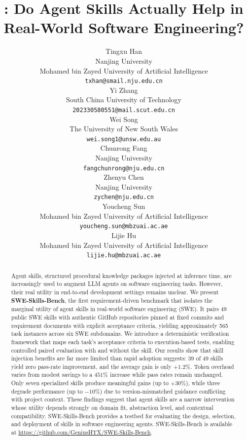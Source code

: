 \documentclass{article}
\title{\ours{}: Do Agent Skills Actually Help in Real-World Software Engineering?}
\author{
  Tingxu Han \footnotemark[1]\\
  Nanjing University \\
  Mohamed bin Zayed University of Artificial Intelligence \\
  \texttt{txhan@smail.nju.edu.cn} \\[-0.3em]
  \And
  Yi Zhang \\
  South China University of Technology \\
  \texttt{202330580551@mail.scut.edu.cn} \\[-0.3em]
  \And
  Wei Song \\
  The University of New South Wales \\
  \texttt{wei.song1@unsw.edu.au} \\[-0.3em]
  \And
  Chunrong Fang \footnotemark[3]\\
  Nanjing University \\
  \texttt{fangchunrong@nju.edu.cn} \\[-0.3em]
  \And
  Zhenyu Chen \\
  Nanjing University \\
  \texttt{zychen@nju.edu.cn} \\[-0.3em]
  \And
  Youcheng Sun \\
  Mohamed bin Zayed University of Artificial Intelligence \\
  \texttt{youcheng.sun@mbzuai.ac.ae} \\[-0.3em]
  \And
  Lijie Hu \footnotemark[3]\\
  Mohamed bin Zayed University of Artificial Intelligence \\
  \texttt{lijie.hu@mbzuai.ac.ae} \\
}
\newcommand{\ours}{SWE-Skills-Bench}
\begin{document}
\maketitle
\renewcommand{\thefootnote}{\fnsymbol{footnote}}
\vspace{-2em}
\begin{abstract}
Agent skills, structured procedural knowledge packages injected at inference time, are increasingly used to augment LLM agents on software engineering tasks.
However, their real utility in end-to-end development settings remains unclear.
We present \textbf{\ours{}}, the first requirement-driven benchmark that isolates the marginal utility of agent skills in real-world software engineering (SWE).
It pairs 49 public SWE skills with authentic GitHub repositories pinned at fixed commits and requirement documents with explicit acceptance criteria, yielding approximately 565 task instances across six SWE subdomains.
We introduce a deterministic verification framework that maps each task's acceptance criteria to execution-based tests, enabling controlled paired evaluation with and without the skill.
Our results show that skill injection benefits are far more limited than rapid adoption suggests: 39 of 49 skills yield zero pass-rate improvement, and the average gain is only $+1.2\%$. Token overhead varies from modest savings to a $451\%$ increase while pass rates remain unchanged. Only seven specialized skills produce meaningful gains (up to $+30\%$), while three degrade performance (up to $-10\%$) due to version-mismatched guidance conflicting with project context.
These findings suggest that agent skills are a narrow intervention whose utility depends strongly on domain fit, abstraction level, and contextual compatibility.
SWE-Skills-Bench provides a testbed for evaluating the design, selection, and deployment of skills in software engineering agents.
\ours{} is available at \url{https://github.com/GeniusHTX/SWE-Skills-Bench}.

\end{abstract}
\end{document}
